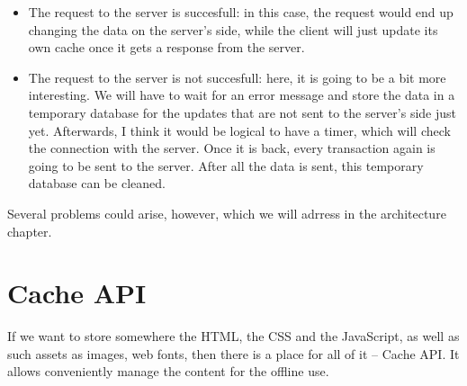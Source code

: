 \begin{itemize}
\item{The request to the server is succesfull: in this case, the request would end up changing the data on the server's side, while the client will just update its own cache once it gets a response from the server.}
\item{The request to the server is not succesfull: here, it is going to be a bit more interesting. We will have to wait for an error message and store the data in a temporary database for the updates that are not sent to the server's side just yet. Afterwards, I think it would be logical to have a timer, which will check the connection with the server. Once it is back, every transaction again is going to be sent to the server. After all the data is sent, this temporary database can be cleaned. }

\end{itemize}

Several problems could arise, however, which we will adrress in the architecture chapter.

\section{Cache API}

If we want to store somewhere the HTML, the CSS and the JavaScript, as well as such assets as images, web fonts, then there is a place for all of it -- Cache API. It allows conveniently manage the content for the offline use. 